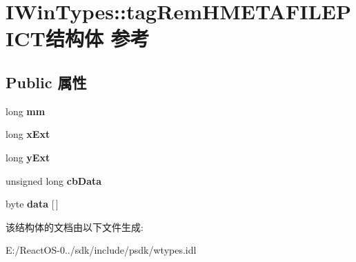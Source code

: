 \hypertarget{struct_i_win_types_1_1tag_rem_h_m_e_t_a_f_i_l_e_p_i_c_t}{}\section{I\+Win\+Types\+:\+:tag\+Rem\+H\+M\+E\+T\+A\+F\+I\+L\+E\+P\+I\+C\+T结构体 参考}
\label{struct_i_win_types_1_1tag_rem_h_m_e_t_a_f_i_l_e_p_i_c_t}
\subsection*{Public 属性}
\begin{DoxyCompactItemize}
\item 
\mbox{\label{struct_i_win_types_1_1tag_rem_h_m_e_t_a_f_i_l_e_p_i_c_t_abb5fdc30232deb3f741db01556ee6d06}} 
long {\bfseries mm}
\item 
\mbox{\label{struct_i_win_types_1_1tag_rem_h_m_e_t_a_f_i_l_e_p_i_c_t_a7c01c547f03ff2788592b643e7513a4c}} 
long {\bfseries x\+Ext}
\item 
\mbox{\label{struct_i_win_types_1_1tag_rem_h_m_e_t_a_f_i_l_e_p_i_c_t_a3f3eef7813e2fbbefe4e3efc80ebe45a}} 
long {\bfseries y\+Ext}
\item 
\mbox{\label{struct_i_win_types_1_1tag_rem_h_m_e_t_a_f_i_l_e_p_i_c_t_a48ad4fcdcd61dd3c6bf3ab7d6c5d3963}} 
unsigned long {\bfseries cb\+Data}
\item 
\mbox{\label{struct_i_win_types_1_1tag_rem_h_m_e_t_a_f_i_l_e_p_i_c_t_a82504fe97c971902c336f5c5f03c69df}} 
byte {\bfseries data} \mbox{[}$\,$\mbox{]}
\end{DoxyCompactItemize}


该结构体的文档由以下文件生成\+:\begin{DoxyCompactItemize}
\item 
E\+:/\+React\+O\+S-\/0../sdk/include/psdk/wtypes.\+idl\end{DoxyCompactItemize}
